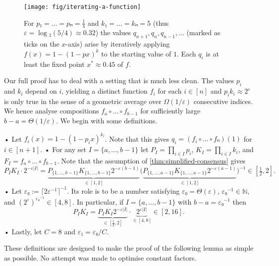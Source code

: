 \documentclass[cleveref,thm-restate]{lipics-v2021}
\begin{document}
\begin{figure}[tb]
    \centering
    \texttt{[image: fig/iterating-a-function]}
    \caption{For $p₁ = … = pₙ = \frac{1}{4}$ and $k₁ = … = kₙ = 5$ (thus $ε = \log₂(5/4) ≈ 0.32$) the values $q_{n+1},q_{n},q_{n-1},…$ (marked as ticks on the $x$-axis) arise by iteratively applying $f(x) = 1-(1-px)^k$ to the starting value of $1$. Each $q_i$ is at least the fixed point $x^* ≈ 0.45$ of $f$.}
    \label{fig:iterating-a-function}
\end{figure}

Our full proof has to deal with a setting that is much less clean. The values $p_i$ and $k_i$ depend on $i$, yielding a distinct function $f_i$ for each $i ∈ [n]$ and $p_i k_i ≈ 2^ε$ is only true in the sense of a geometric average over $Ω(1/ε)$ consecutive indices. We hence analyse compositions $f_{a}∘…∘f_{b-1}$ for sufficiently large $b-a = Θ(1/ε)$.
\label{sec:simplified-consensus-lemma}%
We begin with some definitions.

\begin{itemize}
    • Let $f_i(x) = 1-(1-p_i x)^{k_i}$. Note that this gives $q_i = (f_i ∘ … ∘ fₙ)(1)$ for $i ∈ [n+1]$.
    • For any set $I = \{a,…,b-1\}$ let
    $P_I = \prod_{i ∈ I} p_i$, $K_I = \prod_{i ∈ I} k_i$, and $F_I = f_a ∘ … ∘ f_{b-1}$.
    Note that the assumption of \cref{thm:simplified-consensus} gives
    \[
        P_I K_I ·2^{-ε|I|} =
        \underbrace{P_{\{1,…,b-1\}} K_{\{1,…,b-1\}} 2^{-ε(b-1)}}_{∈ [1,2]}
        \Big( \underbrace{P_{\{1,…,a-1\}} K_{\{1,…,a-1\}} 2^{-ε(a-1)}}_{∈ [1,2]} \Big)^{-1} ∈ [\tfrac 12,2].
    \]
    • Let $ε₀ := ⌈2ε^{-1}⌉^{-1}$. Its role is to be a number satisfying
    $ε₀ = Θ(ε)$, $ε₀^{-1} ∈ ℕ$, and $(2^{ε})^{ε₀^{-1}} ∈ [4,8]$.
    In particular, if $I = \{a,…,b-1\}$ with $b-a = ε₀^{-1}$ then
    \[
        P_I K_I = \underbrace{P_I K_I 2^{-ε|I|}}_{∈ [\tfrac 12,2] } · \underbrace{2^{ε|I|}}_{∈ [4,8]} ∈ [2,16].
    \]
    • Lastly, let $C = 8$ and $ε₁ = ε₀/C$.
\end{itemize}

These definitions are designed to make the proof of the following lemma as simple as possible. No attempt was made to optimise constant factors.
\end{document}
